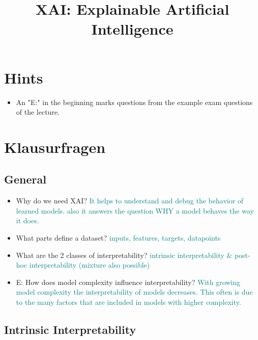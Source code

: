 \documentclass{report}
\title{XAI: Explainable Artificial Intelligence}
\newcommand{\asw}[2][teal]{}
\renewcommand{\asw}[2][teal]{\textcolor{#1}{#2}}
\begin{document}
	
	\maketitle
	\newpage
	
	\tableofcontents
	\newpage
	
	\chapter{Hints}
	
	\begin{itemize}
		\item An "E:" in the beginning marks questions from the example exam questions of the lecture.
	\end{itemize}
	
	\chapter{Klausurfragen}
	
	\section{General}
	
	\begin{itemize}
		\item Why do we need XAI?
		\asw{\newline It helps to understand and debug the behavior of learned models. also it answers the question WHY a model behaves the way it does.}
		\item What parts define a dataset?
		\asw{\newline inputs, features, targets, datapoints}
		\item What are the 2 classes of interpretability?
		\asw{\newline intrinsic interpretability \& post-hoc interpretability (mixture also possible)}
		\item E: How does model complexity influence interpretability?
		\asw{\newline With growing model complexity the interpretability of models decreases. This often is due to the many factors that are included in models with higher complexity.}
	\end{itemize}

	\section{Intrinsic Interpretability}
	
\end{document}
